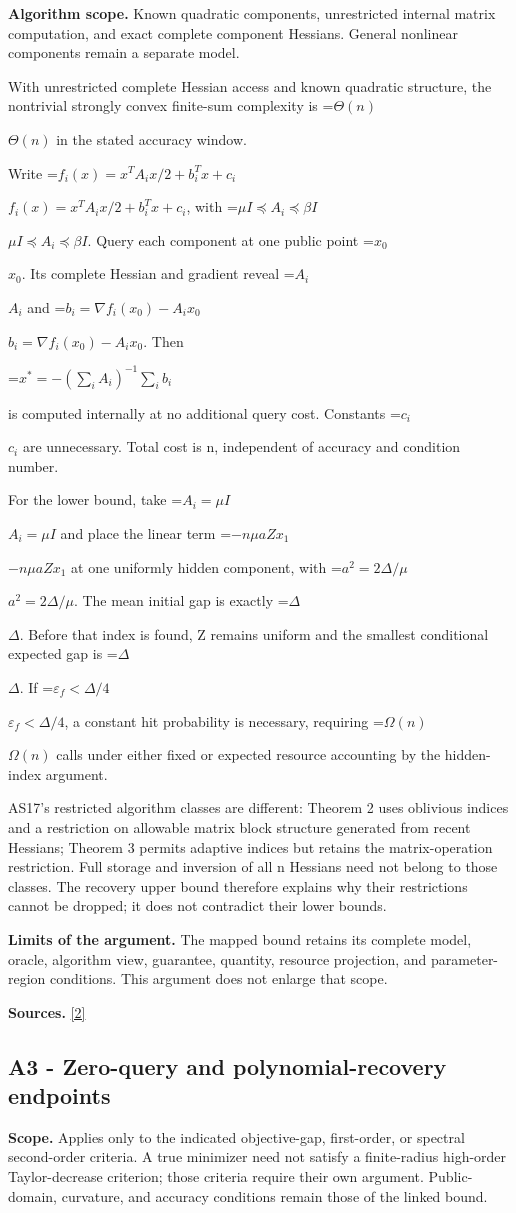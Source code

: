 \documentclass[10pt,a4paper]{article}
\newcommand{\AtlasMath}[1]{\par\begingroup\centering\setbox0=\hbox{$\displaystyle #1$}\ifdim\wd0>1.4\linewidth\typeout{ATLAS WIDE FORMULA: \the\wd0}\fi\ifdim\wd0>\linewidth\resizebox{\linewidth}{!}{\box0}\else\box0\fi\par\endgroup}
\newcommand{\AtlasInlineMath}[1]{\begingroup\setbox0=\hbox{$#1$}\ifdim\wd0>.4\linewidth\endgroup\AtlasMath{#1}\else\endgroup$#1$\fi}
\begin{document}
\textbf{Algorithm scope.} Known quadratic components, unrestricted internal matrix computation, and exact complete component Hessians. General nonlinear components remain a separate model.

With unrestricted complete Hessian access and known quadratic structure, the nontrivial strongly convex finite-sum complexity is \AtlasInlineMath{\Theta(n)} in the stated accuracy window.

Write \AtlasInlineMath{f_i(x)=x^TA_i x/2+b_i^Tx+c_i}, with \AtlasInlineMath{\mu I\preceq A_i\preceq\beta I}. Query each component at one public point \AtlasInlineMath{x_0}. Its complete Hessian and gradient reveal \AtlasInlineMath{A_i} and \AtlasInlineMath{b_i=\nabla f_i(x_0)-A_ix_0}. Then

\AtlasMath{x^*=-\left(\sum_iA_i\right)^{-1}\sum_i b_i}

is computed internally at no additional query cost. Constants \AtlasInlineMath{c_i} are unnecessary. Total cost is n, independent of accuracy and condition number.

For the lower bound, take \AtlasInlineMath{A_i=\mu I} and place the linear term \AtlasInlineMath{-n\mu aZx_1} at one uniformly hidden component, with \AtlasInlineMath{a^2=2\Delta/\mu}. The mean initial gap is exactly \AtlasInlineMath{\Delta}. Before that index is found, Z remains uniform and the smallest conditional expected gap is \AtlasInlineMath{\Delta}. If \AtlasInlineMath{\varepsilon_f<\Delta/4}, a constant hit probability is necessary, requiring \AtlasInlineMath{\Omega(n)} calls under either fixed or expected resource accounting by the hidden-index argument.

AS17's restricted algorithm classes are different: Theorem 2 uses oblivious indices and a restriction on allowable matrix block structure generated from recent Hessians; Theorem 3 permits adaptive indices but retains the matrix-operation restriction. Full storage and inversion of all n Hessians need not belong to those classes. The recovery upper bound therefore explains why their restrictions cannot be dropped; it does not contradict their lower bounds.

\textbf{Limits of the argument.} The mapped bound retains its complete model, oracle, algorithm view, guarantee, quantity, resource projection, and parameter-region conditions. This argument does not enlarge that scope.

\textbf{Sources.} \href{https://proceedings.mlr.press/v70/arjevani17a/arjevani17a.pdf}{[2]}

\subsection{A3 - Zero-query and polynomial-recovery endpoints}
\textbf{Scope.} Applies only to the indicated objective-gap, first-order, or spectral second-order criteria. A true minimizer need not satisfy a finite-radius high-order Taylor-decrease criterion; those criteria require their own argument. Public-domain, curvature, and accuracy conditions remain those of the linked bound.
\end{document}
